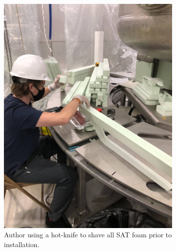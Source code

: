 \begin{figure}[!tbph]
  \begin{subfigure}{.5\textwidth}
  \centering
  \includegraphics[width=\linewidth]{Figures/Construction/foam_shaving.jpg}
  \caption{Author using a hot-knife to shave all SAT foam prior to installation.}
  \label{fig:foam_saving}
  \end{subfigure}
  \begin{subfigure}{.5\textwidth}
  \centering

\end{subfigure}
\end{figure}
